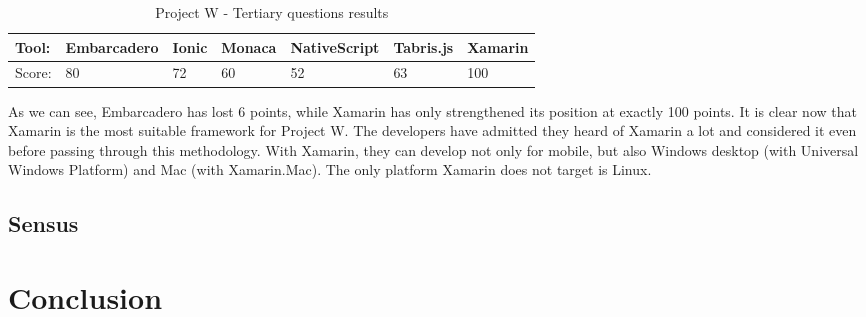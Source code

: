\documentclass[english,master,public,dept460,male,cpdeclaration,oneside]{diploma}
\begin{document}
\begin{table}[!h]
	\centering
	\caption{Project W - Tertiary questions results}
	\begin{tabular}{p{2cm} | p{1.5cm} | p{1.5cm} | p{1.5cm} | p{1.5cm} | p{1.5cm} | p{1.5cm}}
		\toprule		
		\textbf{Tool:} & \textbf{Embarcadero} & \textbf{Ionic} & \textbf{Monaca} & \textbf{NativeScript} & \textbf{Tabris.js} & \textbf{Xamarin} \\
		\midrule
		Score: & 80 & 72 & 60 & 52 & 63 & 100 \\		
		\midrule
	\end{tabular}
\end{table}

As we can see, Embarcadero has lost 6 points, while Xamarin has only strengthened its position at exactly 100 points. It is clear now that Xamarin is the most suitable framework for Project W. The developers have admitted they heard of Xamarin a lot and considered it even before passing through this methodology. With Xamarin, they can develop not only for mobile, but also Windows desktop (with Universal Windows Platform) and Mac (with Xamarin.Mac). The only platform Xamarin does not target is Linux.

\subsection{Sensus}



\section{Conclusion}
\end{document}
